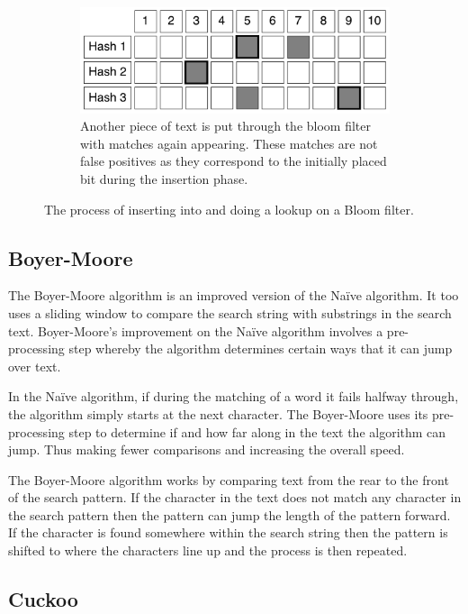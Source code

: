 \documentclass{article}
\begin{document}
\begin{figure}[hbt]
  \ContinuedFloat  
  \label{bloom-6}
  \centering
  \begin{subfigure}{\textwidth}
  \makeatletter
  \includegraphics[width=\textwidth]{images/bloom-6}
  \caption{Another piece of text is put through the bloom filter with matches again appearing. These matches are not false positives as they correspond to the initially placed bit during the insertion phase.}
  \end{subfigure}
  \caption{The process of inserting into and doing a lookup on a Bloom filter.}
\end{figure}

\subsection{Boyer-Moore}

The Boyer-Moore algorithm \citep{Boyer1977} is an improved version of the Na{\"i}ve algorithm. It too uses a sliding window to compare the search string with substrings in the search text. Boyer-Moore's improvement on the Na{\"i}ve algorithm involves a pre-processing step whereby the algorithm determines certain ways that it can jump over text.

In the Na{\"i}ve algorithm, if during the matching of a word it fails halfway through, the algorithm simply starts at the next character. The Boyer-Moore uses its pre-processing step to determine if and how far along in the text the algorithm can jump. Thus making fewer comparisons and increasing the overall speed.

The Boyer-Moore algorithm works by comparing text from the rear to the front of the search pattern. If the character in the text does not match any character in the search pattern then the pattern can jump the length of the pattern forward. If the character is found somewhere within the search string then the pattern is shifted to where the characters line up and the process is then repeated.

\subsection{Cuckoo}
\cite{Fan2014}
\end{document}
